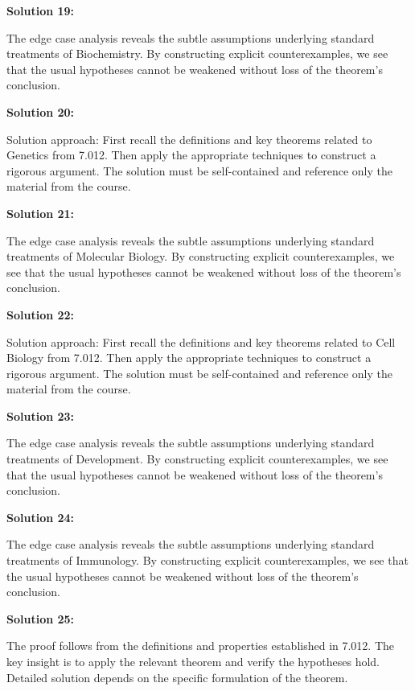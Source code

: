 \documentclass[12pt,a4paper]{exam}
\begin{document}
\vspace{0.5cm}

\textbf{Solution 19:}

The edge case analysis reveals the subtle assumptions underlying standard treatments of Biochemistry. By constructing explicit counterexamples, we see that the usual hypotheses cannot be weakened without loss of the theorem's conclusion.

\vspace{0.5cm}

\textbf{Solution 20:}

Solution approach: First recall the definitions and key theorems related to Genetics from 7.012. Then apply the appropriate techniques to construct a rigorous argument. The solution must be self-contained and reference only the material from the course.

\vspace{0.5cm}

\textbf{Solution 21:}

The edge case analysis reveals the subtle assumptions underlying standard treatments of Molecular Biology. By constructing explicit counterexamples, we see that the usual hypotheses cannot be weakened without loss of the theorem's conclusion.

\vspace{0.5cm}

\textbf{Solution 22:}

Solution approach: First recall the definitions and key theorems related to Cell Biology from 7.012. Then apply the appropriate techniques to construct a rigorous argument. The solution must be self-contained and reference only the material from the course.

\vspace{0.5cm}

\textbf{Solution 23:}

The edge case analysis reveals the subtle assumptions underlying standard treatments of Development. By constructing explicit counterexamples, we see that the usual hypotheses cannot be weakened without loss of the theorem's conclusion.

\vspace{0.5cm}

\textbf{Solution 24:}

The edge case analysis reveals the subtle assumptions underlying standard treatments of Immunology. By constructing explicit counterexamples, we see that the usual hypotheses cannot be weakened without loss of the theorem's conclusion.

\vspace{0.5cm}

\textbf{Solution 25:}

The proof follows from the definitions and properties established in 7.012. The key insight is to apply the relevant theorem and verify the hypotheses hold. Detailed solution depends on the specific formulation of the theorem.

\vspace{0.5cm}
\end{document}
